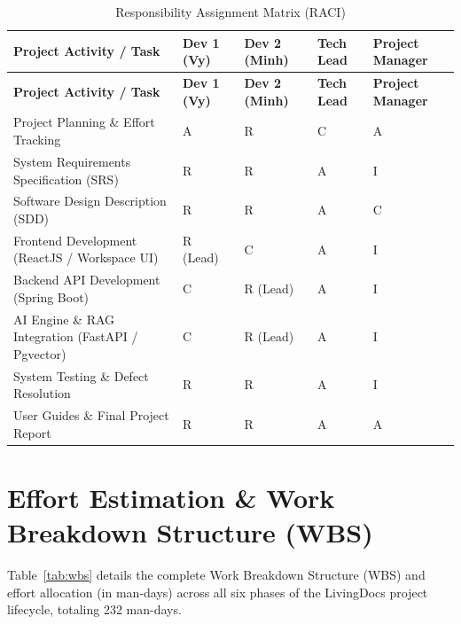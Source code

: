 \begin{footnotesize}
\begin{longtable}{|p{3.1cm}|p{1.5cm}|p{1.7cm}|p{1.7cm}|p{1.7cm}|}
\caption{Responsibility Assignment Matrix (RACI)}\label{tab:raci}\\
\hline
\hline
\textbf{Project Activity / Task} & \textbf{Dev 1 (Vy)} & \textbf{Dev 2 (Minh)} & \textbf{Tech Lead} & \textbf{Project Manager} \\
\hline
\hline
\endfirsthead
\hline
\textbf{Project Activity / Task} & \textbf{Dev 1 (Vy)} & \textbf{Dev 2 (Minh)} & \textbf{Tech Lead} & \textbf{Project Manager} \\
\hline
\hline
\endhead
Project Planning \& Effort Tracking & A & R & C & A \\
\hline
System Requirements Specification (SRS) & R & R & A & I \\
\hline
Software Design Description (SDD) & R & R & A & C \\
\hline
Frontend Development (ReactJS / Workspace UI) & R (Lead) & C & A & I \\
\hline
Backend API Development (Spring Boot) & C & R (Lead) & A & I \\
\hline
AI Engine \& RAG Integration (FastAPI / Pgvector) & C & R (Lead) & A & I \\
\hline
System Testing \& Defect Resolution & R & R & A & I \\
\hline
User Guides \& Final Project Report & R & R & A & A \\
\hline
\hline
\end{longtable}
\end{footnotesize}

\section{Effort Estimation \& Work Breakdown Structure (WBS)}

Table~\ref{tab:wbs} details the complete Work Breakdown Structure (WBS) and effort
allocation (in man-days) across all six phases of the LivingDocs project lifecycle,
totaling 232 man-days.

